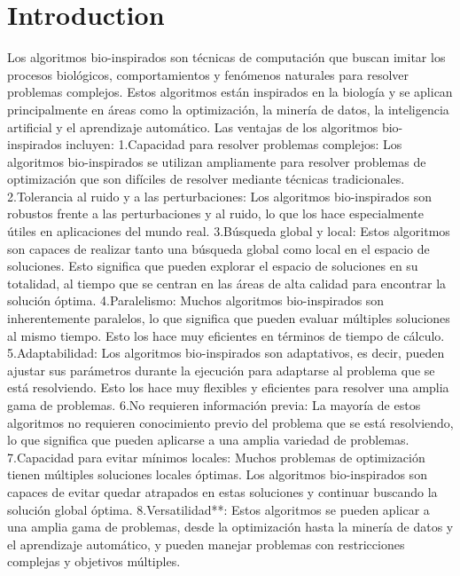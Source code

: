 \documentclass[final,5p,times,twocolumn]{elsarticle}
\begin{document}
\section{Introduction}
\label{sec:in}
Los algoritmos bio-inspirados son técnicas de computación que buscan imitar los procesos biológicos, comportamientos y fenómenos naturales para resolver problemas complejos. Estos algoritmos están inspirados en la biología y se aplican principalmente en áreas como la optimización, la minería de datos, la inteligencia artificial y el aprendizaje automático.
Las ventajas de los algoritmos bio-inspirados incluyen:
1.Capacidad para resolver problemas complejos: Los algoritmos bio-inspirados se utilizan ampliamente para resolver problemas de optimización que son difíciles de resolver mediante técnicas tradicionales.
2.Tolerancia al ruido y a las perturbaciones: Los algoritmos bio-inspirados son robustos frente a las perturbaciones y al ruido, lo que los hace especialmente útiles en aplicaciones del mundo real.
3.Búsqueda global y local: Estos algoritmos son capaces de realizar tanto una búsqueda global como local en el espacio de soluciones. Esto significa que pueden explorar el espacio de soluciones en su totalidad, al tiempo que se centran en las áreas de alta calidad para encontrar la solución óptima.
4.Paralelismo: Muchos algoritmos bio-inspirados son inherentemente paralelos, lo que significa que pueden evaluar múltiples soluciones al mismo tiempo. Esto los hace muy eficientes en términos de tiempo de cálculo.
5.Adaptabilidad: Los algoritmos bio-inspirados son adaptativos, es decir, pueden ajustar sus parámetros durante la ejecución para adaptarse al problema que se está resolviendo. Esto los hace muy flexibles y eficientes para resolver una amplia gama de problemas.
6.No requieren información previa: La mayoría de estos algoritmos no requieren conocimiento previo del problema que se está resolviendo, lo que significa que pueden aplicarse a una amplia variedad de problemas.
7.Capacidad para evitar mínimos locales: Muchos problemas de optimización tienen múltiples soluciones locales óptimas. Los algoritmos bio-inspirados son capaces de evitar quedar atrapados en estas soluciones y continuar buscando la solución global óptima.
8.Versatilidad**: Estos algoritmos se pueden aplicar a una amplia gama de problemas, desde la optimización hasta la minería de datos y el aprendizaje automático, y pueden manejar problemas con restricciones complejas y objetivos múltiples.
\end{document}

